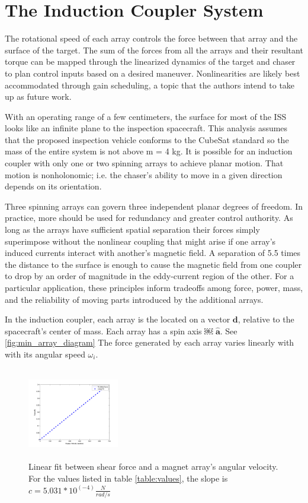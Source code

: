 \section{The Induction Coupler System}

The rotational speed of each array controls the force between that array and the surface of the target. The sum of the forces from all the arrays and their resultant torque can be mapped through the linearized dynamics of the target and chaser to plan control inputs based on a desired maneuver. Nonlinearities are likely best accommodated through gain scheduling, a topic that the authors intend to take up as future work.

With an operating range of a few centimeters, the surface for most of the ISS looks like an infinite plane to the inspection spacecraft. This analysis assumes that the proposed inspection vehicle conforms to the CubeSat standard so the mass of the entire system is not above m = 4 kg.
It is possible for an induction coupler with only one or two spinning arrays to achieve planar motion. That motion is nonholonomic; i.e. the chaser’s ability to move in a given direction depends on its orientation.

Three spinning arrays can govern three independent planar degrees of freedom. In practice, more should be used for redundancy and greater control authority. As long as the arrays have sufficient spatial separation their forces simply superimpose without the nonlinear coupling that might arise if one array’s induced currents interact with another’s magnetic field. A separation of 5.5 times the distance to the surface is enough to cause the magnetic field from one coupler to drop by an order of magnitude in the eddy-current region of the other. For a particular application, these principles inform tradeoffs among force, power, mass, and the reliability of moving parts introduced by the additional arrays.

In the induction coupler, each array is the located on a vector $\boldsymbol{d}$, relative to the spacecraft's center of mass. Each array has a spin axis ￼ $\hat{\boldsymbol{a}}$. See \ref{fig:min_array_diagram} The force generated by each array varies linearly with with its angular speed $\omega_i$.

\begin{figure}
\label{fig:lin_fit}
\includegraphics[width = 4cm, height = 4cm ]{figures/lin_fit.png}
\caption{Linear fit between shear force and a magnet array's angular velocity. For the values listed in table \ref{table:values}, the slope is $c = 5.031 * 10^(-4) \frac{N}{rad/s}$}
\end{figure}

